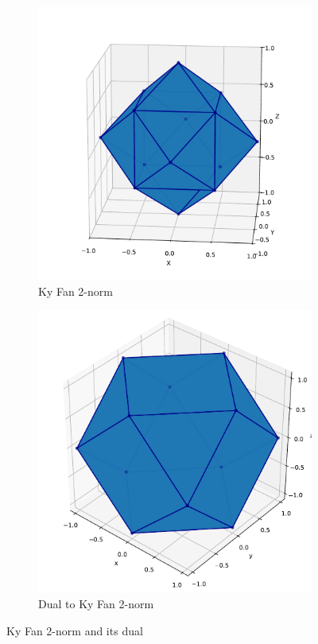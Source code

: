 \documentclass{article} %
\begin{document}
\begin{figure}[h!]
    \centering
    \begin{subfigure}[b]{0.45\linewidth}
        \centering
        \includegraphics[width=\linewidth]{figs/KyFan.pdf}
        \caption{Ky Fan 2-norm}
        \label{fig:kyfan}
    \end{subfigure}
    \hfill
    \begin{subfigure}[b]{0.45\linewidth}
        \centering
        \includegraphics[width=\linewidth]{figs/KyFanDual.pdf}
        \caption{Dual to Ky Fan 2-norm}
        \label{fig:kyfandual}
    \end{subfigure}
    \caption{Ky Fan 2-norm and its dual}
    \label{fig:kyfan_combined}
\end{figure}
\end{document}
